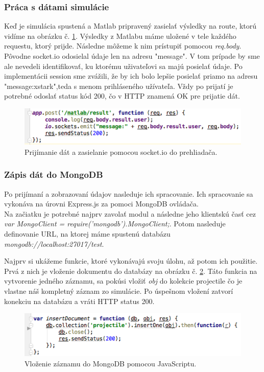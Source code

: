 \subsubsection{Práca s dátami simulácie}
Keď je simulácia spustená a Matlab pripravený zasielať výsledky na route, ktorú vidíme na obrázku č. \ref{img-express-socketio}. Výsledky z Matlabu máme uložené v tele každého requestu, ktorý prijde. Následne môžeme k nim prístupiť pomocou \textit{req.body}. Pôvodne socket.io odosielal údaje len na adresu "message". V tom prípade by sme ale nevedeli identifikovať, ku ktorému uživateľovi sa majú posielať údaje. Po implementácii session sme zvážili, že by ich bolo lepšie posielať priamo na adresu "message:xstark",teda s menom prihláseného užívateľa. Vždy po prijatí je potrebné odoslať status kód 200, čo v HTTP znamená OK pre prijatie dát.

\begin{figure}[H]
  \centering
  \includegraphics[scale=0.7]{img/code/express-socketio.png}
  \caption{Prijímanie dát a zasielanie pomocou socket.io do prehliadača.}
  \label{img-express-socketio}
\end{figure}

\subsubsection{Zápis dát do MongoDB}
Po prijímaní a zobrazovaní údajov nasleduje ich spracovanie. Ich spracovanie sa vykonáva na úrovni Express.js za pomoci MongoDB ovládača.\\
Na začiatku je potrebné najprv zavolať modul a následne jeho klientskú časť cez \textit{var MongoClient = require('mongodb').MongoClient;}. Potom nasleduje definovanie URL, na ktorej máme spustenú databázu \textit{mongodb://localhost:27017/test}.

Najprv si ukážeme funkcie, ktoré vykonávajú svoju úlohu, až potom ich použitie. Prvá z nich je vloženie dokumentu do databázy na obrázku č. \ref{img-express-mongo-insert}. Táto funkcia na vytvorenie jedného záznamu, sa pokúsi vložiť \textit{obj} do kolekcie projectile čo je vlastne náš kompletný záznam zo simulácie. Po úspešnom vložení zatvorí konekciu na databázu a vráti HTTP status 200.

\begin{figure}[H]
  \centering
  \includegraphics[scale=0.7]{img/code/express-mongo-insert.png}
  \caption{Vloženie záznamu do MongoDB pomocou JavaScriptu.}
  \label{img-express-mongo-insert}
\end{figure}

